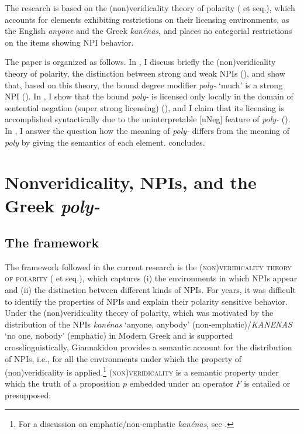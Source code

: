 \documentclass[output=paper]{langscibook}
\begin{document}
The research is based on the (non)veridicality theory of polarity (\citealt{giannaki1997dissert,giannaki1998,giannaki2001free} et seq.), which accounts for elements exhibiting restrictions on their licensing environments, as the English \textit{anyone} and the Greek \textit{kanénas}, and places no categorial restrictions on the items showing NPI behavior.

The paper is organized as follows. In , I discuss briefly the (non)veridicality theory of polarity, the distinction between strong and weak NPIs (), and show that, based on this theory, the bound degree modifier \textit{poly-} ‘much’ is a strong NPI (). In , I show that the bound \textit{poly-} is licensed only locally in the domain of sentential negation (super strong licensing) (), and I claim that its licensing is accomplished syntactically due to the uninterpretable [uNeg] feature of \textit{poly-} (). In , I answer the question how the meaning of \textit{poly-} differs from the meaning of \textit{poly} by giving the semantics of each element.  concludes.

\section{Nonveridicality, NPIs, and the Greek \textit{poly-}}\label{gia:sec:nonveridicality}

\subsection{The framework} \label{gia:sub:framework}

The framework followed in the current research is the \textsc{(non)veridicality theory of polarity} (\citealt{giannakidou1994licensing,giannaki1997dissert,giannaki2001free} et seq.), which captures (i) the environments in which NPIs appear and (ii) the distinction between different kinds of NPIs. For years, it was difficult to identify the properties of NPIs and explain their polarity sensitive behavior. Under the (non)veridicality theory of polarity, which was motivated by the distribution of the NPIs \textit{kanénas} `anyone, anybody' (non-emphatic)\slash\textit{KANENAS} `no one, nobody' (emphatic) in Modern Greek and is supported crosslinguistically, Giannakidou provides a semantic account for the distribution of NPIs, i.e., for all the environments under which the property of (non)veridicality is applied.\footnote{For a discussion on emphatic/non-emphatic \textit{kanénas}, see \citet{giannaki1997dissert, giannaki1998, giannaki2000n}.} \textsc{(non)veridicality} is a semantic property under which the truth of a proposition $p$ embedded under an operator $F$ is entailed or presupposed:
\end{document}
